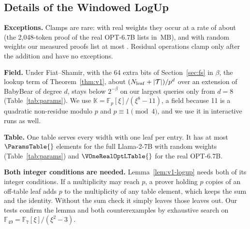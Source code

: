 \providecommand{\Kpre}{\mathsf{K}_{\mathrm{pre}}}
\providecommand{\sC}{\mathsf{C}}
\providecommand{\sK}{\mathsf{K}}
\providecommand{\F}{\mathbb{F}_p}
\providecommand{\para}[1]{\par\noindent\textbf{#1}\quad}
\providecommand{\todo}[1]{\textbf{[TODO: #1]}}
\providecommand{\Fext}{\mathbb{K}}
\providecommand{\Veq}{\mathrm{eq}}

\subsection{Details of the Windowed LogUp}

\para{Exceptions.} Clamps are rare: with real weights they occur at a rate of about \VOneRealOptLExceptionRate{} (the
2{,}048-token proof of the real OPT-6.7B lists \VOneRealOptLExceptions{} in \VOneRealOptLExceptionsMB{}\,MB), and with random weights our
measured proofs list at most \VOneRandomExceptionsMax{}. Residual operations clamp only after the addition
and have no exceptions.

\para{Field.} Under Fiat--Shamir, with the 64 extra bits of Section~\ref{sec:fs} in $\beta$, the
lookup term of Theorem~\ref{thm:v1}, about $(N_{\mathrm{leaf}}+|\mathcal{T}|)/p^d$ over an extension of BabyBear of
degree $d$, stays below $2^{-\beta}$ on our largest queries only from $d=8$ (Table~\ref{tab:params}).
We use $\Fext =
\F[\xi]/(\xi^8 - 11)$, a field because 11 is a quadratic non-residue modulo $p$ and $p \equiv 1
\pmod 4$, and we use it in interactive runs as well.

\para{Table.} One table serves every width with one leaf per entry. It has at most
$\ParamsTable{}$ elements for the full Llama-2-7B with random weights (Table~\ref{tab:params}) and
$\VOneRealOptLTable{}$ for the real OPT-6.7B.

\para{Both integer conditions are needed.} Lemma~\ref{lem:v1-logup} needs both of its integer
conditions. If a multiplicity may reach $p$, a prover holding $p$ copies of an off-table leaf adds
$p$ to the multiplicity of any table element, which keeps the sum and the identity. Without the sum
check it simply leaves those leaves out. Our tests confirm the lemma and both counterexamples by
exhaustive search on $\mathbb F_{49} = \mathbb F_7[\xi]/(\xi^2 - 3)$.

